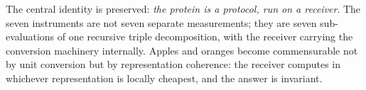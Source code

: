 \documentclass[11pt,twocolumn,a4paper]{article}
\theoremstyle{definition}
\theoremstyle{remark}
\begin{document}
The central identity is preserved: \emph{the protein is a protocol, run on a receiver}. The seven instruments are not seven separate measurements; they are seven sub-evaluations of one recursive triple decomposition, with the receiver carrying the conversion machinery internally. Apples and oranges become commensurable not by unit conversion but by representation coherence: the receiver computes in whichever representation is locally cheapest, and the answer is invariant.



\end{document}
